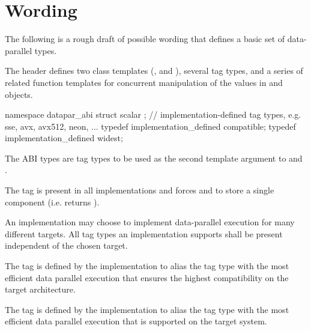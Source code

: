 \section{Wording}

The following is a rough draft of possible wording that defines a basic set of data-parallel types.

\begin{wgText}

  

  \pnum
  The header  defines two class templates (\datapar, and \mask), several tag types, and a series of related function templates for concurrent manipulation of the values in \datapar and \mask objects.

  \begin{itemdecl}
namespace datapar_abi {
  struct scalar {};
  // implementation-defined tag types, e.g. sse, avx, avx512, neon, ...
  typedef implementation_defined compatible;
  typedef implementation_defined widest;
}
  \end{itemdecl}
  \begin{itemdescr}
    \pnum
    The ABI types are tag types to be used as the second template argument to \datapar and \mask.

    \pnum
    The  tag is present in all implementations and forces \datapar and \mask to store a single component (i.e. \datapar{} returns ).

    \pnum
    An implementation may choose to implement data-parallel execution for many different targets.
    All tag types an implementation supports shall be present independent of the chosen target.

    \pnum
    The  tag is defined by the implementation to alias the tag type with the most efficient data parallel execution that ensures the highest compatibility on the target architecture.

    \pnum
    The  tag is defined by the implementation to alias the tag type with the most efficient data parallel execution that is supported on the target system.
  \end{itemdescr}


\end{wgText}
